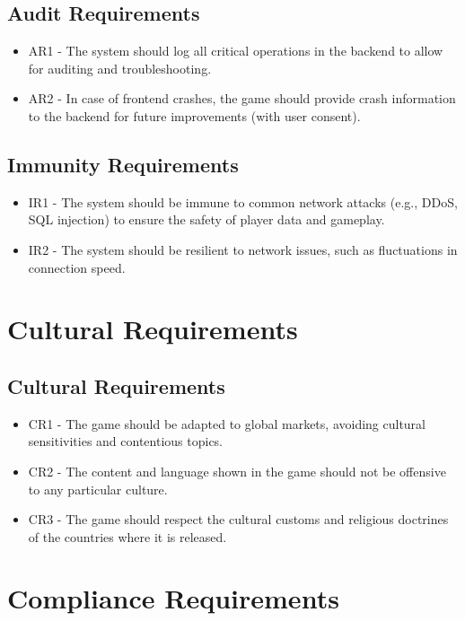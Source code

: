 \documentclass[12pt]{article}
\begin{document}
\subsection{Audit Requirements}
\begin{itemize}
    \item AR1 - The system should log all critical operations in the backend to allow for auditing and troubleshooting.
    \item AR2 - In case of frontend crashes, the game should provide crash information to the backend for future improvements (with user consent).
\end{itemize}

\subsection{Immunity Requirements}
\begin{itemize}
    \item IR1 - The system should be immune to common network attacks (e.g., DDoS, SQL injection) to ensure the safety of player data and gameplay.
    \item IR2 - The system should be resilient to network issues, such as fluctuations in connection speed.
\end{itemize}

\section{Cultural Requirements}

\subsection{Cultural Requirements}
\begin{itemize}
    \item CR1 - The game should be adapted to global markets, avoiding cultural sensitivities and contentious topics.
    \item CR2 - The content and language shown in the game should not be offensive to any particular culture.
    \item CR3 - The game should respect the cultural customs and religious doctrines of the countries where it is released.
\end{itemize}

\section{Compliance Requirements}
\end{document}
